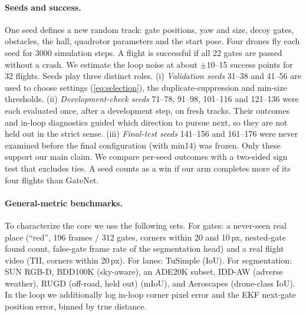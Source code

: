 \documentclass[10pt,twocolumn,letterpaper]{article}
\begin{document}
\paragraph{Seeds and success.}
One seed defines a new random track: gate positions, yaw and size, decoy gates, obstacles, the hall, quadrotor parameters and the start pose. Four drones fly each seed for 3000 simulation steps. A flight is successful if all 22 gates are passed without a crash. We estimate the loop noise at about $\pm$10--15 success points for 32 flights. Seeds play three distinct roles. (i) \emph{Validation seeds} 31--38 and 41--56 are used to choose settings (\cref{eq:selection}), \eg the duplicate-suppression and min-size thresholds. (ii) \emph{Development-check seeds} 71--78, 91--98, 101--116 and 121--136 were each evaluated once, after a development step, on fresh tracks. Their outcomes and in-loop diagnostics guided which direction to pursue next, so they are not held out in the strict sense. (iii) \emph{Final-test seeds} 141--156 and 161--176 were never examined before the final configuration (with min14) was frozen. Only these support our main claim. We compare per-seed outcomes with a two-sided sign test that excludes ties. A seed counts as a win if our arm completes more of its four flights than GateNet.

\paragraph{General-metric benchmarks.}
To characterize the core we use the following sets. For gates: a never-seen real place (``red'', 196 frames / 312 gates, corners within 20 and 10\,px, nested-gate found count, false-gate frame rate of the segmentation head) and a real flight video (TII, corners within 20\,px). For lanes: TuSimple (IoU). For segmentation: SUN RGB-D, BDD100K (sky-aware), an ADE20K subset, IDD-AW (adverse weather), RUGD (off-road, held out) (mIoU), and Aeroscapes (drone-class IoU). In the loop we additionally log in-loop corner pixel error and the EKF next-gate position error, binned by true distance.
\end{document}
